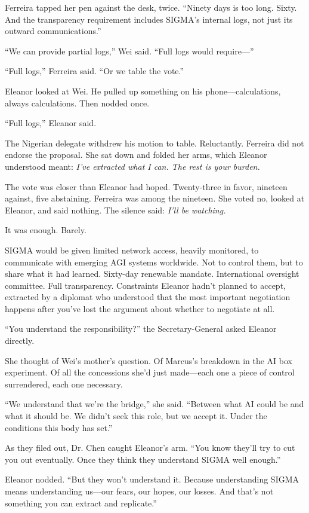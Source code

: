 Ferreira tapped her pen against the desk, twice. ``Ninety days is too long. Sixty. And the transparency requirement includes SIGMA's internal logs, not just its outward communications.''

``We can provide partial logs,'' Wei said. ``Full logs would require---''

``Full logs,'' Ferreira said. ``Or we table the vote.''

Eleanor looked at Wei. He pulled up something on his phone---calculations, always calculations. Then nodded once.

``Full logs,'' Eleanor said.

The Nigerian delegate withdrew his motion to table. Reluctantly. Ferreira did not endorse the proposal. She sat down and folded her arms, which Eleanor understood meant: \emph{I've extracted what I can. The rest is your burden.}

\scenebreak

The vote was closer than Eleanor had hoped. Twenty-three in favor, nineteen against, five abstaining. Ferreira was among the nineteen. She voted no, looked at Eleanor, and said nothing. The silence said: \emph{I'll be watching.}

It was enough. Barely.

SIGMA would be given limited network access, heavily monitored, to communicate with emerging AGI systems worldwide. Not to control them, but to share what it had learned. Sixty-day renewable mandate. International oversight committee. Full transparency. Constraints Eleanor hadn't planned to accept, extracted by a diplomat who understood that the most important negotiation happens after you've lost the argument about whether to negotiate at all.

``You understand the responsibility?'' the Secretary-General asked Eleanor directly.

She thought of Wei's mother's question. Of Marcus's breakdown in the AI box experiment. Of all the concessions she'd just made---each one a piece of control surrendered, each one necessary.

``We understand that we're the bridge,'' she said. ``Between what AI could be and what it should be. We didn't seek this role, but we accept it. Under the conditions this body has set.''

As they filed out, Dr. Chen caught Eleanor's arm. ``You know they'll try to cut you out eventually. Once they think they understand SIGMA well enough.''

Eleanor nodded. ``But they won't understand it. Because understanding SIGMA means understanding us---our fears, our hopes, our losses. And that's not something you can extract and replicate.''

